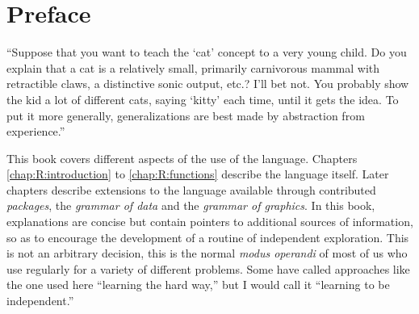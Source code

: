 \chapter*{Preface}

\begin{VF}
``Suppose that you want to teach the `cat' concept to a very young child. Do you explain that a cat is a relatively small, primarily carnivorous mammal with retractible claws, a distinctive sonic output, etc.? I'll bet not. You probably show the kid a lot of different cats, saying `kitty' each time, until it gets the idea. To put it more generally, generalizations are best made by abstraction from experience.''

\nocite{Boas1981}
\end{VF}



\noindent
This book covers different aspects of the use of the \Rlang language. Chapters \ref{chap:R:introduction} to \ref{chap:R:functions} describe the \Rlang language itself. Later chapters describe extensions to the \Rlang language available through contributed \emph{packages}, the \emph{grammar of data} and the \emph{grammar of graphics}. In this book, explanations are concise but contain pointers to additional sources of information, so as to encourage the development of a routine of independent exploration. This is not an arbitrary decision, this is the normal \emph{modus operandi} of most of us who use \Rlang regularly for a variety of different problems. Some have called approaches like the one used here ``learning the hard way,'' but I would call it ``learning to be independent.''

